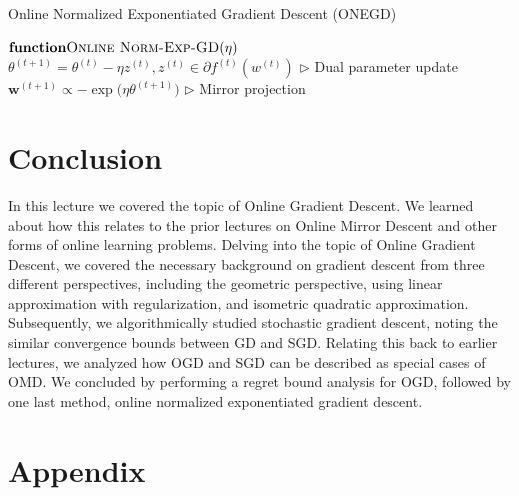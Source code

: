 \documentclass[11pt]{article}
\begin{document}
\begin{algorithm}[H]
\caption{Online Normalized Exponentiated Gradient Descent (ONEGD)}
\label{algo:onegd}
\begin{algorithmic}[1]
\STATE $\textbf{function} \textsc{Online Norm-Exp-GD}(\eta)$
\STATE $\theta^{(t+1)} = \theta^{(t)} - \eta z^{(t)}, z^{(t)} \in \partial f^{(t)}(w^{(t)})$  \hfill $\triangleright$ Dual parameter update
\STATE $\textbf{w}^{(t+1)} \propto - \exp \big( \eta\theta^{(t+1)} \big)$ \hfill $\triangleright$
Mirror projection
\ENDFOR
\end{algorithmic}
\end{algorithm}


\section{Conclusion}

In this lecture we covered the topic of Online Gradient Descent. We learned about how this relates to the prior lectures on Online Mirror Descent and other forms of online learning problems. Delving into the topic of Online Gradient Descent, we covered the necessary background on gradient descent from three different perspectives, including the geometric perspective, using linear approximation with regularization, and isometric quadratic approximation. Subsequently, we algorithmically studied stochastic gradient descent, noting the similar convergence bounds between GD and SGD. Relating this back to earlier lectures, we analyzed how OGD and SGD can be described as special cases of OMD. We concluded by performing a regret bound analysis for OGD, followed by one last method, online normalized exponentiated gradient descent.

{


}

\section{Appendix}
\end{document}
